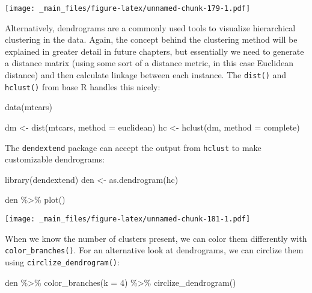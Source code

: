 \documentclass[
]{book}
\newenvironment{Shaded}{\begin{snugshade}}{\end{snugshade}}
\newcommand{\AttributeTok}[1]{\textcolor[rgb]{0.77,0.63,0.00}{#1}}
\newcommand{\DecValTok}[1]{\textcolor[rgb]{0.00,0.00,0.81}{#1}}
\newcommand{\FunctionTok}[1]{\textcolor[rgb]{0.00,0.00,0.00}{#1}}
\newcommand{\NormalTok}[1]{#1}
\newcommand{\OtherTok}[1]{\textcolor[rgb]{0.56,0.35,0.01}{#1}}
\newcommand{\SpecialCharTok}[1]{\textcolor[rgb]{0.00,0.00,0.00}{#1}}
\newcommand{\StringTok}[1]{\textcolor[rgb]{0.31,0.60,0.02}{#1}}
\begin{document}
\texttt{[image: \_main\_files/figure-latex/unnamed-chunk-179-1.pdf]}

Alternatively, dendrograms are a commonly used tools to visualize hierarchical clustering in the data. Again, the concept behind the clustering method will be explained in greater detail in future chapters, but essentially we need to generate a distance matrix (using some sort of a distance metric, in this case Euclidean distance) and then calculate linkage between each instance. The \texttt{dist()} and \texttt{hclust()} from base R handles this nicely:

\begin{Shaded}
\begin{Highlighting}[]
\FunctionTok{data}\NormalTok{(mtcars)}

\NormalTok{dm }\OtherTok{\textless{}{-}} \FunctionTok{dist}\NormalTok{(mtcars, }\AttributeTok{method =} \StringTok{\textquotesingle{}euclidean\textquotesingle{}}\NormalTok{)}
\NormalTok{hc }\OtherTok{\textless{}{-}} \FunctionTok{hclust}\NormalTok{(dm, }\AttributeTok{method =} \StringTok{\textquotesingle{}complete\textquotesingle{}}\NormalTok{)}
\end{Highlighting}
\end{Shaded}

The \texttt{dendextend} package can accept the output from \texttt{hclust} to make customizable dendrograms:

\begin{Shaded}
\begin{Highlighting}[]
\FunctionTok{library}\NormalTok{(dendextend)}
\NormalTok{den }\OtherTok{\textless{}{-}} \FunctionTok{as.dendrogram}\NormalTok{(hc)}

\NormalTok{den }\SpecialCharTok{\%\textgreater{}\%} \FunctionTok{plot}\NormalTok{()}
\end{Highlighting}
\end{Shaded}

\texttt{[image: \_main\_files/figure-latex/unnamed-chunk-181-1.pdf]}

When we know the number of clusters present, we can color them differently with \texttt{color\_branches()}. For an alternative look at dendrograms, we can circlize them using \texttt{circlize\_dendrogram()}:

\begin{Shaded}
\begin{Highlighting}[]
\NormalTok{den }\SpecialCharTok{\%\textgreater{}\%} \FunctionTok{color\_branches}\NormalTok{(}\AttributeTok{k =} \DecValTok{4}\NormalTok{) }\SpecialCharTok{\%\textgreater{}\%}
  \FunctionTok{circlize\_dendrogram}\NormalTok{()}
\end{Highlighting}
\end{Shaded}
\end{document}
